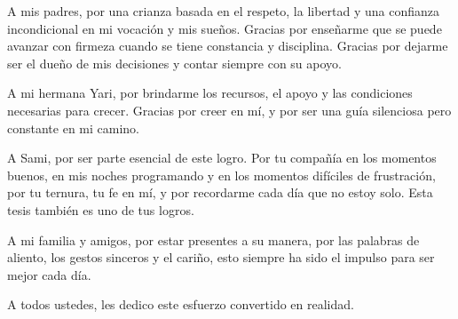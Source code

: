 \dedication

\parskip 10pt  \setlength{\parindent}{0pc}

A mis padres, por una crianza basada en el respeto, la libertad y una confianza incondicional en mi vocación y mis sueños. Gracias por enseñarme que se puede avanzar con firmeza cuando se tiene constancia y disciplina. Gracias por dejarme ser el dueño de mis decisiones y contar siempre con su apoyo.

A mi hermana Yari, por brindarme los recursos, el apoyo y las condiciones necesarias para crecer. Gracias por creer en mí, y por ser una guía silenciosa pero constante en mi camino.

A Sami, por ser parte esencial de este logro. Por tu compañía en los momentos buenos, en mis noches programando y en los momentos difíciles de frustración, por tu ternura, tu fe en mí, y por recordarme cada día que no estoy solo. Esta tesis también es uno de tus logros.

A mi familia y amigos, por estar presentes a su manera, por las palabras de aliento, los gestos sinceros y el cariño, esto siempre ha sido el impulso para ser mejor cada día.

A todos ustedes, les dedico este esfuerzo convertido en realidad.